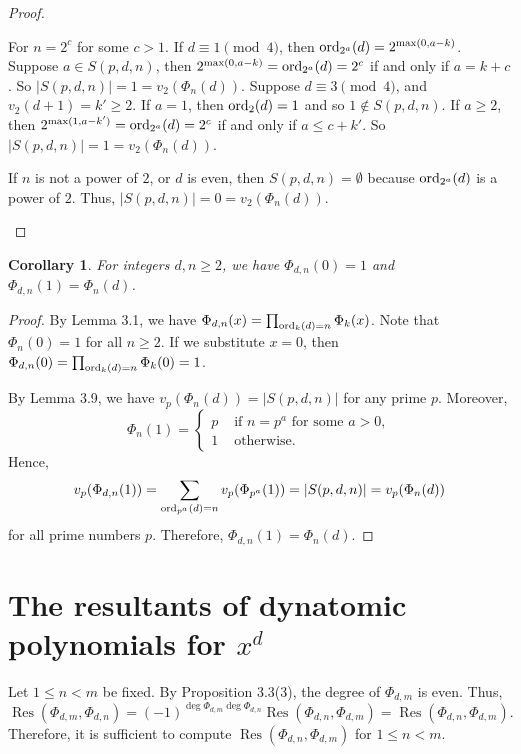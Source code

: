 \documentclass[10pt,leqno]{amsart}
\newtheorem{corollary}[theorem]{Corollary}
\theoremstyle{definition}
\theoremstyle{remark}
\numberwithin{equation}{section}
\def\ord{{\rm ord}}
\newcommand{\res}{\operatorname{Res}}
\begin{document}
\begin{proof}
\begin{enumerate}
        For $n = 2^c$ for some $c> 1$. If $d\equiv 1\pmod 4$, then $\ord_{2^a}(d) = 2^{\max(0,a-k)}$. Suppose $a\in S(p,d,n)$, then $2^{\max(0,a-k)} = \ord_{2^a}(d) = 2^c$ if and only if $a = k+c$. So $|S(p,d,n)| = 1 = v_2(\Phi_n(d))$. Suppose $d\equiv 3\pmod 4$, and $v_2(d+1) = k'\geq 2$. If $a = 1$, then $\ord_2(d) = 1$ and so $1\not\in S(p,d,n)$. If $a\geq 2$, then $2^{\max(1,a-k')} = \ord_{2^a}(d) = 2^c$ if and only if $a\leq c+k'$. So $|S(p,d,n)| = 1 = v_2(\Phi_n(d))$.

        If $n$ is not a power of $2$, or $d$ is even, then $S(p,d,n) = \emptyset$ because $\ord_{2^a}(d)$ is a power of $2$. Thus, $|S(p,d,n)| = 0 = v_2(\Phi_n(d))$.
    \end{enumerate}
\end{proof}

\begin{corollary}
    For integers $d,n\geq 2$, we have $\Phi_{d,n}(0) = 1$ and $\Phi_{d,n}(1) = \Phi_n(d)$.
\end{corollary}

\begin{proof}
    By Lemma 3.1, we have $\Phi_{d,n}(x) = \prod_{\ord_k(d) = n}\Phi_k(x)$. Note that $\Phi_n(0) = 1$ for all $n\geq 2$. If we substitute $x = 0$, then $\Phi_{d,n}(0) = \prod_{\ord_k(d) = n}\Phi_k(0) = 1$. 

    By Lemma 3.9, we have $v_p(\Phi_n(d)) = |S(p,d,n)|$ for any prime $p$. Moreover, $$\Phi_n(1) = \begin{cases}
        p &\text{ if }n = p^a\text{ for some }a>0,\\
        1 &\text{ otherwise.}
    \end{cases}$$
    Hence,
    $$v_p(\Phi_{d,n}(1)) = \sum_{\ord_{p^a}(d) = n}v_p(\Phi_{p^a}(1)) = |S(p,d,n)| = v_p(\Phi_n(d))$$ 
    for all prime numbers $p$. Therefore, $\Phi_{d,n}(1) = \Phi_n(d)$. 
\end{proof}

\section{The resultants of dynatomic polynomials for $x^d$}

Let $1\leq n<m$ be fixed. By Proposition 3.3(3), the degree of $\Phi_{d,m}$ is even. Thus,
$$\res(\Phi_{d,m},\Phi_{d,n}) = (-1)^{\deg \Phi_{d,m}\deg \Phi_{d,n}}\res(\Phi_{d,n},\Phi_{d,m}) = \res(\Phi_{d,n},\Phi_{d,m}).$$
Therefore, it is sufficient to compute $\res(\Phi_{d,n},\Phi_{d,m})$ for $1\leq n<m$. 
\end{document}
